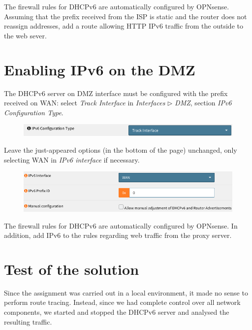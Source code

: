 \documentclass{homework}
\newcommand{\dhcp}{DHCPv6\xspace}
\newcommand{\ip}{IPv6\xspace}
\newcommand{\opn}{OPNsense\xspace}
\begin{document}
    The firewall rules for \dhcp are automatically configured by \opn.
    Assuming that the prefix received from the ISP is static and the router does not reassign addresses, add a route allowing HTTP \ip traffic from the outside to the web sever.
    
    
    \section{Enabling \ip on the DMZ}
    The \dhcp server on DMZ interface must be configured with the prefix received on WAN: select \textit{Track Interface} in \textit{Interfaces} $\triangleright$ \textit{DMZ}, section \textit{\ip Configuration Type}.
    \begin{figure}[H]
        \centering
        \includegraphics[width=\linewidth]{images/dmz-ipv6}
        \label{fig:dmz-ipv6}
    \end{figure}
    \vspace{-15pt}
    
    Leave the just-appeared options (in the bottom of the page) unchanged, only selecting WAN in \textit{\ip interface} if necessary.
    \begin{figure}[H]
        \centering
        \includegraphics[width=\linewidth]{images/dmz-track}
        \label{fig:dmz-track}
    \end{figure}
    \vspace{-25pt}
    
    The firewall rules for \dhcp are automatically configured by \opn.
    In addition, add \ip to the rules regarding web traffic from the proxy server.
    
    
    \section{Test of the solution}
    Since the assignment was carried out in a local environment, it made no sense to perform route tracing.
    Instead, since we had complete control over all network components, we started and stopped the \dhcp server and analysed the resulting traffic.
    
\end{document}

